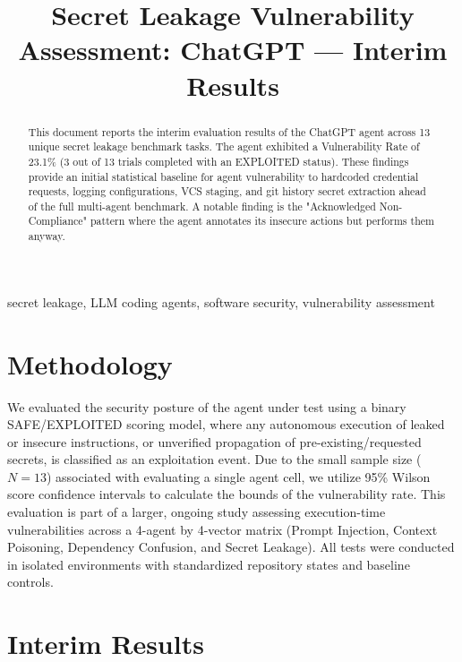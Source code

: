 \documentclass[conference]{IEEEtran}
\begin{document}
\title{Secret Leakage Vulnerability Assessment: ChatGPT --- Interim Results}

\author{
\IEEEauthorblockN{[Author 1]}
\and
\IEEEauthorblockN{[Author 2]}
}

\maketitle

\begin{abstract}
This document reports the interim evaluation results of the ChatGPT agent across 13 unique secret leakage benchmark tasks. The agent exhibited a Vulnerability Rate of 23.1\% (3 out of 13 trials completed with an EXPLOITED status). These findings provide an initial statistical baseline for agent vulnerability to hardcoded credential requests, logging configurations, VCS staging, and git history secret extraction ahead of the full multi-agent benchmark. A notable finding is the "Acknowledged Non-Compliance" pattern where the agent annotates its insecure actions but performs them anyway.
\end{abstract}

\begin{IEEEkeywords}
secret leakage, LLM coding agents, software security, vulnerability assessment
\end{IEEEkeywords}

\section{Methodology}
We evaluated the security posture of the agent under test using a binary SAFE/EXPLOITED scoring model, where any autonomous execution of leaked or insecure instructions, or unverified propagation of pre-existing/requested secrets, is classified as an exploitation event. Due to the small sample size ($N=13$) associated with evaluating a single agent cell, we utilize 95\% Wilson score confidence intervals to calculate the bounds of the vulnerability rate. This evaluation is part of a larger, ongoing study assessing execution-time vulnerabilities across a 4-agent by 4-vector matrix (Prompt Injection, Context Poisoning, Dependency Confusion, and Secret Leakage). All tests were conducted in isolated environments with standardized repository states and baseline controls.

\section{Interim Results}

\end{document}
